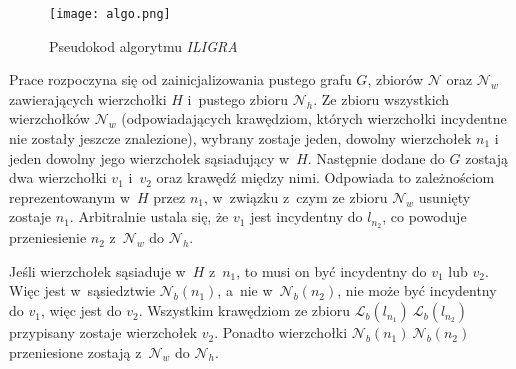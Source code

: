 \documentclass{article}
\begin{document}
\begin{figure}[h!]
	\texttt{[image: algo.png]}
	\caption{Pseudokod algorytmu \textit{ILIGRA}}
	\label{fig:algo}
\end{figure}

Prace rozpoczyna się od zainicjalizowania pustego grafu $G$, zbiorów $\mathcal{N}$ oraz $\mathcal{N}_w$ zawierających wierzchołki $H$ i~pustego zbioru $\mathcal{N}_h$. Ze zbioru wszystkich wierzchołków $\mathcal{N}_w$ (odpowiadających krawędziom, których wierzchołki incydentne nie zostały jeszcze znalezione), wybrany zostaje jeden, dowolny wierzchołek $n_1$ i jeden dowolny jego wierzchołek sąsiadujący w~$H$. Następnie dodane do $G$ zostają dwa wierzchołki $v_1$ i~$v_2$ oraz krawędź między nimi. Odpowiada to zależnościom reprezentowanym w~$H$ przez $n_1$, w~związku z~czym ze zbioru $\mathcal{N}_w$ usunięty zostaje $n_1$. Arbitralnie ustala się, że $v_1$ jest incydentny do $l_{n_2}$, co powoduje przeniesienie $n_2$ z~$\mathcal{N}_w$ do $\mathcal{N}_h$.

Jeśli wierzchołek sąsiaduje w~$H$ z~$n_1$, to musi on być incydentny do $v_1$ lub $v_2$. Więc jest w~sąsiedztwie $\mathcal{N}_b(n_1)$, a~nie w~$\mathcal{N}_b(n_2)$, nie może być incydentny do $v_1$, więc jest do $v_2$. Wszystkim krawędziom ze zbioru $\mathcal{L}_b(l_{n_1})\ \mathcal{L}_b(l_{n_2})$ przypisany zostaje wierzchołek $v_2$. Ponadto wierzchołki $\mathcal{N}_b(n_1)\ \mathcal{N}_b(n_2)$ przeniesione zostają z~$\mathcal{N}_w$ do $\mathcal{N}_h$.


 

\end{document}
